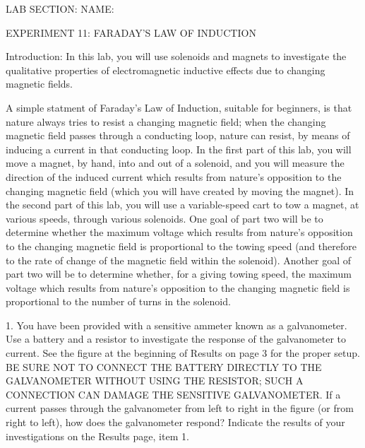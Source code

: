 
\baselineskip=15pt
\vglue-0.7in
\hglue-2.0cm LAB SECTION:
\underbar{~~~~~~~~~~~~~~~~~~~~~~~~~~~~~~~~~~~~~~~~~~~~~~}
 NAME:
\rlap{
\underbar{~~~~~~~~~~~~~~~~~~~~~~~~~~~~~~~~~~~~~~~~~~~~~~}
}
\bigskip
\bigskip
\bigskip
\centerline{EXPERIMENT 11: FARADAY'S LAW OF INDUCTION}
\bigskip
Introduction: In this lab, you will use solenoids and 
magnets to investigate the qualitative properties of
electromagnetic inductive effects due to changing
magnetic fields.

  A simple statment of Faraday's Law of Induction,
suitable for beginners, is that nature always tries to
resist a changing magnetic field; when the changing
magnetic field passes through a conducting loop, nature
can resist, by means of inducing a current in that
conducting loop.  In the first part of this lab, you will
move a magnet, by hand, into and out of a solenoid, and
you will measure the direction of the induced current
which results from nature's opposition to the changing
magnetic field (which you will have created by moving the
magnet).  In the second part of this lab, you will use
a variable-speed cart to tow a magnet, at various
speeds, through various solenoids.  One goal of part 
two will be to determine whether the maximum voltage which
results from nature's opposition to the changing magnetic
field is proportional to the towing speed (and therefore
to the rate of change of the magnetic field within the
solenoid).  Another goal of part two will be to determine
whether, for a giving towing speed, the maximum voltage
which results from nature's opposition to the changing
magnetic field is proportional to the number of turns in
the solenoid.

\bigskip
{}

\item{1.} You have been provided with a sensitive ammeter
known as a galvanometer.  Use a battery and a
resistor to investigate the response of the galvanometer
to current.  See the figure at the beginning of Results
on page 3 for the proper setup.  BE SURE NOT TO 
CONNECT THE BATTERY DIRECTLY TO THE GALVANOMETER WITHOUT
USING THE RESISTOR; SUCH A CONNECTION CAN DAMAGE THE
SENSITIVE GALVANOMETER.  If a current passes through the
galvanometer from left to right in the figure (or from
right to left), how does the galvanometer respond?  Indicate
the results of your investigations on the Results page, item 1.

